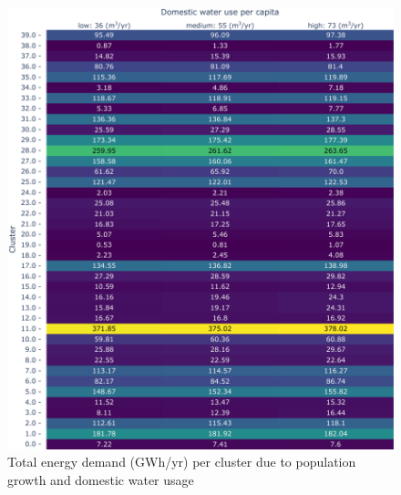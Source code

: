 \documentclass[12pt]{iopart}
\begin{document}
\newpage
\begin{figure}[!h]
	\centering
	\includegraphics[width=\textwidth]{PopSensitivityEnergyCluster}
	\caption{Total energy demand (GWh/yr) per cluster due to population growth and domestic water usage}
	\label{fig:popasensenergycluster}
\end{figure}
\newpage
\end{document}
